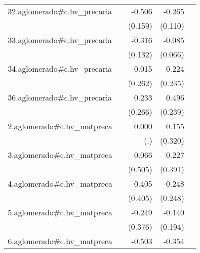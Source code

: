 {\begin{longtable}{l*{4}{D{.}{.}{-1}}}
\addlinespace
32.aglomerado#c.hv\_precaria&                     &      -0.506\sym{**} &      -0.265\sym{*}  &                     \\
            &                     &     (0.159)         &     (0.110)         &                     \\
\addlinespace
33.aglomerado#c.hv\_precaria&                     &      -0.316\sym{*}  &      -0.085         &                     \\
            &                     &     (0.132)         &     (0.066)         &                     \\
\addlinespace
34.aglomerado#c.hv\_precaria&                     &       0.015         &       0.224         &                     \\
            &                     &     (0.262)         &     (0.235)         &                     \\
\addlinespace
36.aglomerado#c.hv\_precaria&                     &       0.233         &       0.496\sym{*}  &                     \\
            &                     &     (0.266)         &     (0.239)         &                     \\
\addlinespace
2.aglomerado#c.hv\_matpreca&                     &       0.000         &       0.155         &                     \\
            &                     &         (.)         &     (0.320)         &                     \\
\addlinespace
3.aglomerado#c.hv\_matpreca&                     &       0.066         &       0.227         &                     \\
            &                     &     (0.505)         &     (0.391)         &                     \\
\addlinespace
4.aglomerado#c.hv\_matpreca&                     &      -0.405         &      -0.248         &                     \\
            &                     &     (0.405)         &     (0.248)         &                     \\
\addlinespace
5.aglomerado#c.hv\_matpreca&                     &      -0.249         &      -0.140         &                     \\
            &                     &     (0.376)         &     (0.194)         &                     \\
\addlinespace
6.aglomerado#c.hv\_matpreca&                     &      -0.503         &      -0.354\sym{*}  &                     \\

\end{longtable}}
